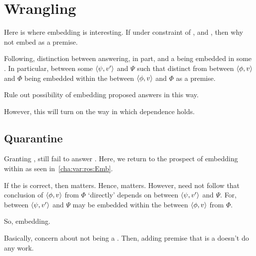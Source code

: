 \section{Wrangling}
\label{sec:wrangling}

\begin{note}
  Here is where embedding is interesting.
  If under constraint of \agpe{}, and \fc{}, then why not embed \fc{} as a premise.

  
\end{note}

\begin{note}
  Following, distinction between \ros{} answering, in part, \qWhyVnP{} and a \ros{} being embedded in some \ros{}.
  In particular, \ros{} between some \(\langle \psi, v' \rangle\) and \(\Psi\) such that distinct from \ros{} between \(\langle \phi, v \rangle\) and \(\Phi\) being embedded within the \ros{} between \(\langle \phi, v \rangle\) and \(\Phi\) as a premise.
\end{note}

\begin{note}
  Rule out possibility of embedding proposed answers in this way.

  However, this will turn on the way in which dependence holds.
\end{note}

\subsection{Quarantine}

\begin{note}
  Granting \agpe{}, still fail to answer \qWhyVnP{}.
  Here, we return to the prospect of embedding  within  as seen in~\autoref{cha:var:ros:Emb}.

  If the \agpe{} is correct, then \fc{} matters.
  Hence, \ros{} matters.
  However, need not follow that conclusion of \(\langle \phi, v \rangle\) from \(\Phi\) `directly' depends on \ros{} between \(\langle \psi, v' \rangle\) and \(\Psi\).
  For, \ros{} between \(\langle \psi, v' \rangle\) and \(\Psi\) may be embedded within the \ros{} between \(\langle \phi, v \rangle\) from \(\Phi\).
\end{note}

\begin{note}
  So, embedding.

  Basically, concern about not being a \fc{}.
  Then, adding premise that is a \fc{} doesn't do any work.
\end{note}

